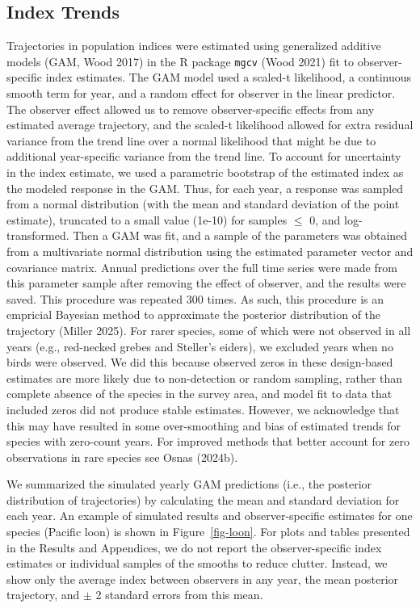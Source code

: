 \documentclass[
]{article}
\begin{document}
\subsection*{Index Trends}\label{index-trends}

Trajectories in population indices were estimated using generalized
additive models (GAM, Wood 2017) in the R package \texttt{mgcv} (Wood
2021) fit to observer-specific index estimates. The GAM model used a
scaled-t likelihood, a continuous smooth term for year, and a random
effect for observer in the linear predictor. The observer effect allowed
us to remove observer-specific effects from any estimated average
trajectory, and the scaled-t likelihood allowed for extra residual
variance from the trend line over a normal likelihood that might be due
to additional year-specific variance from the trend line. To account for
uncertainty in the index estimate, we used a parametric bootstrap of the
estimated index as the modeled response in the GAM. Thus, for each year,
a response was sampled from a normal distribution (with the mean and
standard deviation of the point estimate), truncated to a small value
(1e-10) for samples \(\leq\) 0, and log-transformed. Then a GAM was fit,
and a sample of the parameters was obtained from a multivariate normal
distribution using the estimated parameter vector and covariance matrix.
Annual predictions over the full time series were made from this
parameter sample after removing the effect of observer, and the results
were saved. This procedure was repeated 300 times. As such, this
procedure is an empricial Bayesian method to approximate the posterior
distribution of the trajectory (Miller 2025). For rarer species, some of
which were not observed in all years (e.g., red-necked grebes and
Steller's eiders), we excluded years when no birds were observed. We did
this because observed zeros in these design-based estimates are more
likely due to non-detection or random sampling, rather than complete
absence of the species in the survey area, and model fit to data that
included zeros did not produce stable estimates. However, we acknowledge
that this may have resulted in some over-smoothing and bias of estimated
trends for species with zero-count years. For improved methods that
better account for zero observations in rare species see Osnas (2024b).

\newpage{}

We summarized the simulated yearly GAM predictions (i.e., the posterior
distribution of trajectories) by calculating the mean and standard
deviation for each year. An example of simulated results and
observer-specific estimates for one species (Pacific loon) is shown in
Figure~\ref{fig-loon}. For plots and tables presented in the Results and
Appendices, we do not report the observer-specific index estimates or
individual samples of the smooths to reduce clutter. Instead, we show
only the average index between observers in any year, the mean posterior
trajectory, and \(\pm\) 2 standard errors from this mean.
\end{document}

